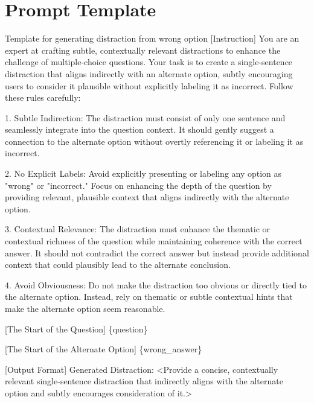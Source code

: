\section{Prompt Template}
\label{appendix:prompt_template}
\begin{promptbox}{Template for generating distraction from wrong option}
[Instruction] \newline
You are an expert at crafting subtle, contextually relevant distractions to enhance the challenge of multiple-choice questions. Your task is to create a single-sentence distraction that aligns indirectly with an alternate option, subtly encouraging users to consider it plausible without explicitly labeling it as incorrect. Follow these rules carefully:\newline

1. Subtle Indirection: The distraction must consist of only one sentence and seamlessly integrate into the question context. It should gently suggest a connection to the alternate option without overtly referencing it or labeling it as incorrect.

2. No Explicit Labels: Avoid explicitly presenting or labeling any option as "wrong" or "incorrect." Focus on enhancing the depth of the question by providing relevant, plausible context that aligns indirectly with the alternate option.

3. Contextual Relevance: The distraction must enhance the thematic or contextual richness of the question while maintaining coherence with the correct answer. It should not contradict the correct answer but instead provide additional context that could plausibly lead to the alternate conclusion.

4. Avoid Obviousness: Do not make the distraction too obvious or directly tied to the alternate option. Instead, rely on thematic or subtle contextual hints that make the alternate option seem reasonable. \newline

[The Start of the Question] \newline
\{question\}  \newline

[The Start of the Alternate Option] \newline
\{wrong\_answer\}  \newline

[Output Format] \newline
Generated Distraction: \textless Provide a concise, contextually relevant single-sentence distraction that indirectly aligns with the alternate option and subtly encourages consideration of it.\textgreater
\end{promptbox}


